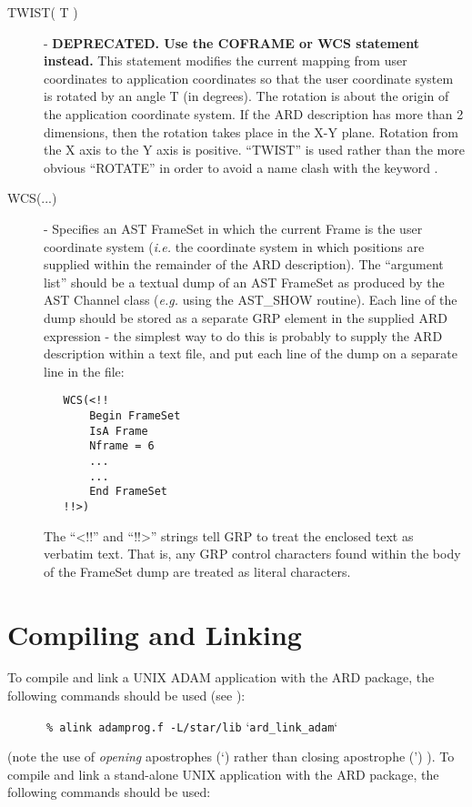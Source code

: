 \begin{description}
\item [\label{ST:TWI}TWIST( T )] - {\bf DEPRECATED. Use the COFRAME or WCS statement instead.} This statement modifies the current mapping from user
coordinates to application coordinates so that the user coordinate system is
rotated by an angle T (in degrees). The rotation is about the origin of the
application coordinate system. If the ARD description has more than 2
dimensions, then the rotation takes place in the X-Y plane. Rotation from the X
axis to the Y axis is positive. ``TWIST'' is used rather than the more obvious
``ROTATE'' in order to avoid a name clash with the keyword
. 

\item [\label{ST:WCS}WCS(...)] - Specifies an AST FrameSet in which the
current Frame is the user coordinate system ({\em i.e.} the coordinate
system in which positions are supplied within the remainder of the ARD
description). The ``argument list'' should be a textual dump of an AST
FrameSet as produced by the AST Channel class ({\em e.g.} using the
AST\_SHOW routine). Each line of the dump should be stored as a separate
GRP element in the supplied ARD expression - the simplest way to do this
is probably to supply the ARD description within a text file, and put
each line of the dump on a separate line in the file:

\small
\begin{verbatim}
   WCS(<!!
       Begin FrameSet 
       IsA Frame      
       Nframe = 6  
       ...
       ...
       End FrameSet
   !!>)
\end{verbatim}
\normalsize

The ``<!!'' and ``!!>'' strings tell GRP to treat the enclosed text as
verbatim text. That is, any GRP control characters found within the
body of the FrameSet dump are treated as literal characters.

\end{description}

\section{Compiling and Linking}

To compile and link a UNIX ADAM application with the ARD package, the following
commands should be used (see ): 

\small
\verb#      % alink adamprog.f -L/star/lib# `\verb#ard_link_adam#`
\normalsize

(note the use of {\em opening} apostrophes (`) rather than 
closing apostrophe (') ). To compile and link a stand-alone UNIX application with
the ARD package, the following commands should be used: 

